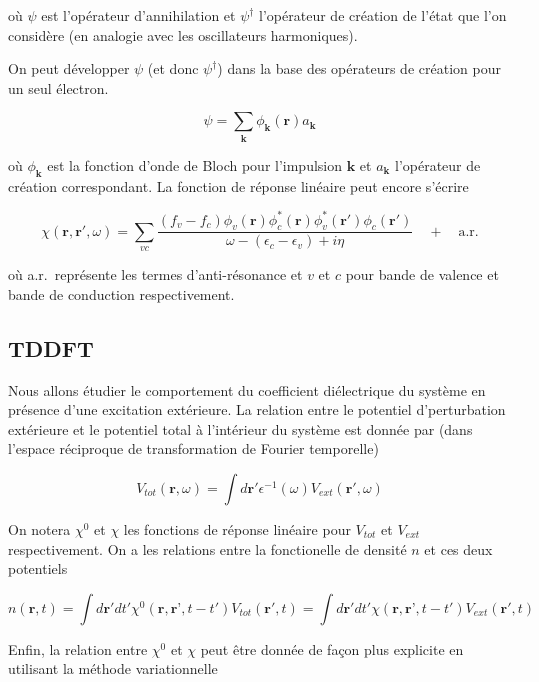 \documentclass[12pt, french]{report}
\theoremstyle{theoreme}
\begin{document}
où $\psi$ est l'opérateur d'annihilation et $\psi^\dagger$ l'opérateur de création de l'état que l'on considère (en analogie avec les oscillateurs harmoniques).

On peut développer $\psi$ (et donc $\psi^\dagger$) dans la base des opérateurs de création
pour un seul électron.

$$
\psi = \sum_\textbf{k} \phi_\textbf{k}(\textbf{r}) a_\textbf{k}
$$

où $\phi_\textbf{k}$ est la fonction d'onde de Bloch pour l'impulsion $\textbf{k}$ et $a_\textbf{k}$ l'opérateur de création correspondant. La fonction de réponse linéaire peut encore s'écrire

\begin{equation}\label{chi}
  \chi(\textbf{r}, \textbf{r}', \omega) = \sum_{vc} \frac{(f_v - f_c)\phi_v(\textbf{r}) \phi_c^*(\textbf{r}) \phi_v^*(\textbf{r}') \phi_c(\textbf{r}')}{\omega - (\epsilon_c - \epsilon_v) + i\eta} \quad + \quad \text{a.r.}
\end{equation}

où a.r.\ représente les termes d'anti-résonance et $v$ et $c$ pour bande de valence et bande de conduction respectivement.

\subsection{TDDFT}
Nous allons étudier le comportement du coefficient diélectrique du système en présence d'une excitation extérieure. La relation entre le potentiel d'perturbation extérieure et le potentiel total à l'intérieur du système est donnée par (dans l'espace réciproque de transformation de Fourier temporelle)

\begin{equation}\label{VtotVext}
V_{tot}(\textbf{r}, \omega) = \int d\textbf{r}' \epsilon^{-1}(\omega) V_{ext}(\textbf{r}', \omega)
\end{equation}

On notera $\chi^0$ et $\chi$ les fonctions de réponse linéaire pour $V_{tot}$ et $V_{ext}$ respectivement. On a les relations entre la fonctionelle de densité $n$ et ces deux potentiels

$$
n(\textbf{r}, t) = \int d\textbf{r}' dt' \chi^0(\textbf{r}, \textbf{r'}, t-t') V_{tot}(\textbf{r}', t) = \int d\textbf{r}' dt' \chi(\textbf{r}, \textbf{r'}, t-t') V_{ext}(\textbf{r}', t)
$$

Enfin, la relation entre $\chi^0$ et $\chi$ peut être donnée de façon plus explicite en utilisant la méthode variationnelle
\end{document}
